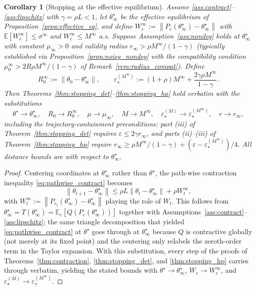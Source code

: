 \documentclass[12pt,a4paper]{article}
\newtheorem{corollary}[definition]{Corollary}
\newcommand{\norm}[1]{\left\lVert#1\right\rVert}
\begin{document}
\begin{corollary}[Stopping at the effective equilibrium]
\label{cor:stop_eff_eq}
Assume \ref{ass:contract}--\ref{ass:lipschitz} with $\gamma = \rho L < 1$,
let $\theta^\star_\infty$ be the effective equilibrium of
Proposition~\ref{prop:effective_eq}, and define
$W_e^\infty := \norm{P_e(\theta^\star_\infty) - \theta^\star_\infty}$ with
$\mathbb{E}[W_e^\infty] \leq \sigma^\infty$ and $W_e^\infty \leq M^\infty$
a.s. Suppose Assumption~\ref{ass:nondeg} holds at $\theta^\star_\infty$ with
constant $\mu_\infty > 0$ and validity radius $r_\infty > \rho
M^\infty/(1-\gamma)$ (typically established via
Proposition~\ref{prop:noisy_nondeg} with the compatibility condition
$\mu_0^\infty > 2 R \rho M^\infty/(1-\gamma)$ of
Remark~\ref{rem:radius_compat}). Define
\[
  R_0^\infty := \norm{\theta_0 - \theta^\star_\infty}, \qquad
  \varepsilon_\star^{(M^\infty)} := (1+\rho)M^\infty + \frac{2\gamma\rho M^\infty}{1-\gamma}.
\]
Then Theorems~\ref{thm:stopping_det}--\ref{thm:stopping_hp} hold verbatim
with the substitutions
\[
  \theta^\star \to \theta^\star_\infty, \quad
  R_0 \to R_0^\infty, \quad
  \mu \to \mu_\infty, \quad
  M \to M^\infty, \quad
  \varepsilon_\star^{(M)} \to \varepsilon_\star^{(M^\infty)}, \quad
  r \to r_\infty,
\]
including the trajectory-containment preconditions: part (iii) of
Theorem~\ref{thm:stopping_det} requires $\varepsilon \leq 2\gamma
r_\infty$, and parts (ii)--(iii) of Theorem~\ref{thm:stopping_hp} require
$r_\infty \geq \rho M^\infty/(1-\gamma) + (\varepsilon -
\varepsilon_\star^{(M^\infty)})/4$. All distance bounds are with respect to
$\theta^\star_\infty$.
\end{corollary}

\begin{proof}
Centering coordinates at $\theta^\star_\infty$ rather than $\theta^\star$,
the path-wise contraction inequality \eqref{eq:pathwise_contract} becomes
\[
  \norm{\theta_{t+1} - \theta^\star_\infty}
  \leq \rho L \norm{\theta_t - \theta^\star_\infty} + \rho W_t^\infty,
\]
with $W_t^\infty := \norm{P_{e_t}(\theta^\star_\infty) -
\theta^\star_\infty}$ playing the role of $W_t$. This follows from
$\theta^\star_\infty = T(\theta^\star_\infty) =
\mathbb{E}_e[Q(P_e(\theta^\star_\infty))]$ together with
Assumptions~\ref{ass:contract}--\ref{ass:lipschitz}; the same triangle
decomposition that yielded \eqref{eq:pathwise_contract} at $\theta^\star$
goes through at $\theta^\star_\infty$ because $Q$ is contractive globally
(not merely at its fixed point) and the centering only relabels the
zeroth-order term in the Taylor expansion. With this substitution, every
step of the proofs of Theorems~\ref{thm:contraction},
\ref{thm:stopping_det}, and \ref{thm:stopping_hp} carries through verbatim,
yielding the stated bounds with $\theta^\star \to \theta^\star_\infty$, $W_e
\to W_e^\infty$, and $\varepsilon_\star^{(M)} \to
\varepsilon_\star^{(M^\infty)}$. \qedhere
\end{proof}
\end{document}
